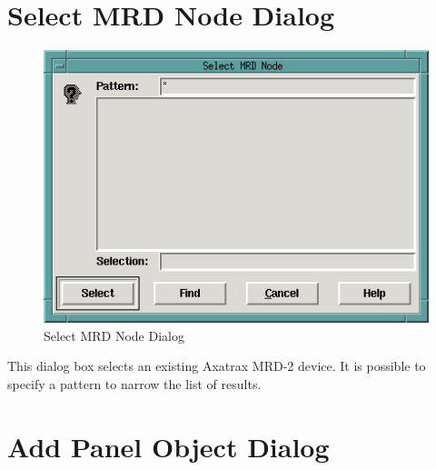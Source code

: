 \section{Select MRD Node Dialog}

\begin{figure}[hbpt]
\begin{centering}
\includegraphics{DISPSelectMRDNodeDialog.png}
\caption{Select MRD Node Dialog}
\label{fig:dispatcher:selectmrdnodedialog}
\end{centering}
\end{figure}
%
This dialog box selects an existing Axatrax MRD-2 device. It is possible to
specify a pattern to narrow the list of results.

\section{Add Panel Object Dialog}

